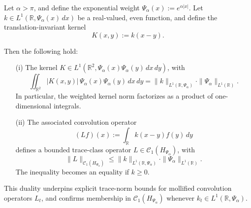 \begin{lemma}
\label{lem:weighted-trace-norm-duality}
Let \( \alpha > \pi \), and define the exponential weight \( \Psi_\alpha(x) := e^{\alpha |x|} \). Let \( k \in L^1(\mathbb{R}, \Psi_\alpha(x)\, dx) \) be a real-valued, even function, and define the translation-invariant kernel
\[
K(x,y) := k(x - y).
\]

Then the following hold:
\begin{enumerate}
    \item[\textup{(i)}] The kernel \( K \in L^1(\mathbb{R}^2, \Psi_\alpha(x)\Psi_\alpha(y)\, dx\,dy) \), with
    \[
    \iint_{\mathbb{R}^2} |K(x,y)|\, \Psi_\alpha(x)\Psi_\alpha(y)\, dx\,dy
    = \|k\|_{L^1(\mathbb{R}, \Psi_\alpha)} \cdot \|\Psi_\alpha\|_{L^1(\mathbb{R})}.
    \]
    In particular, the weighted kernel norm factorizes as a product of one-dimensional integrals.

    \item[\textup{(ii)}] The associated convolution operator
    \[
    (L f)(x) := \int_{\mathbb{R}} k(x - y) f(y)\, dy
    \]
    defines a bounded trace-class operator \( L \in \mathcal{C}_1(H_{\Psi_\alpha}) \), with
    \[
    \| L \|_{\mathcal{C}_1(H_{\Psi_\alpha})}
    \le \|k\|_{L^1(\mathbb{R}, \Psi_\alpha)} \cdot \|\Psi_\alpha\|_{L^1(\mathbb{R})}.
    \]
    The inequality becomes an equality if \( k \ge 0 \).
\end{enumerate}

\medskip
\noindent
This duality underpins explicit trace-norm bounds for mollified convolution operators \( L_t \), and confirms membership in \( \mathcal{C}_1(H_{\Psi_\alpha}) \) whenever \( k_t \in L^1(\mathbb{R}, \Psi_\alpha) \).
\end{lemma}
